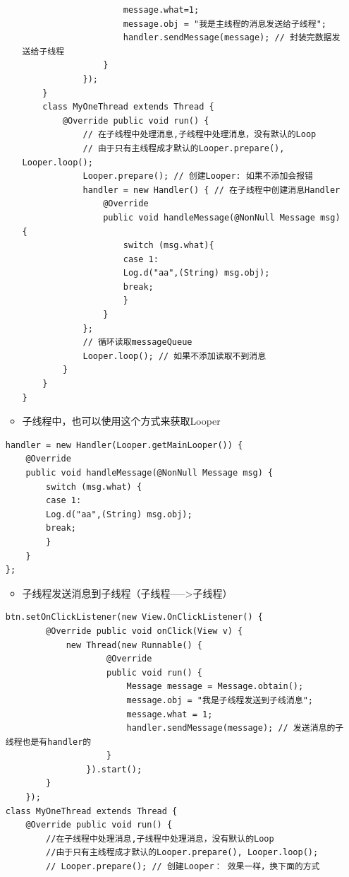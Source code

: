 \documentclass[9pt, b5paper]{article}
\begin{document}
\begin{enumerate}
\begin{itemize}
\begin{verbatim}
                    message.what=1;
                    message.obj = "我是主线程的消息发送给子线程";
                    handler.sendMessage(message); // 封装完数据发送给子线程
                }
            });
    }
    class MyOneThread extends Thread {
        @Override public void run() {
            // 在子线程中处理消息,子线程中处理消息，没有默认的Loop
            // 由于只有主线程成才默认的Looper.prepare(), Looper.loop();
            Looper.prepare(); // 创建Looper: 如果不添加会报错
            handler = new Handler() { // 在子线程中创建消息Handler
                @Override
                public void handleMessage(@NonNull Message msg) {
                    switch (msg.what){
                    case 1:
                    Log.d("aa",(String) msg.obj);
                    break;
                    }
                }
            };
            // 循环读取messageQueue
            Looper.loop(); // 如果不添加读取不到消息
        }
    }
}
\end{verbatim}
\item 子线程中，也可以使用这个方式来获取Looper
\end{itemize}
\begin{verbatim}
handler = new Handler(Looper.getMainLooper()) {
    @Override
    public void handleMessage(@NonNull Message msg) {
        switch (msg.what) {
        case 1:
        Log.d("aa",(String) msg.obj);
        break;
        }
    }
};
\end{verbatim}
\begin{itemize}
\item 子线程发送消息到子线程（子线程----->子线程）
\end{itemize}
\begin{verbatim}
btn.setOnClickListener(new View.OnClickListener() {
        @Override public void onClick(View v) {
            new Thread(new Runnable() {
                    @Override
                    public void run() {
                        Message message = Message.obtain();
                        message.obj = "我是子线程发送到子线消息";
                        message.what = 1;
                        handler.sendMessage(message); // 发送消息的子线程也是有handler的
                    }
                }).start();
        }
    });
class MyOneThread extends Thread {
    @Override public void run() {
        //在子线程中处理消息,子线程中处理消息，没有默认的Loop
        //由于只有主线程成才默认的Looper.prepare(), Looper.loop();
        // Looper.prepare(); // 创建Looper： 效果一样，换下面的方式

\end{verbatim}
\end{enumerate}
\end{document}
